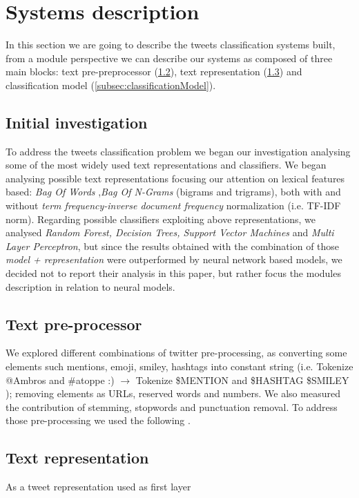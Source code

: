 \section{Systems description} \label{sec:system}

In this section we are going to describe the tweets classification systems built, from a module perspective we can describe our systems as composed of three main blocks: text pre-preprocessor (\cref{subsec:preprocessing}),  text representation (\cref{subsec:representation}) and classification model (\cref{subsec:classificationModel}). 


\subsection{Initial investigation} \label{subsec:boh}
To address the tweets classification problem we began our investigation analysing some of the most widely used text representations and classifiers.
We began analysing possible text representations focusing our attention on lexical features based: \emph{Bag Of Words} \cite{harris1954distributional},\emph{Bag Of N-Grams} (bigrams and trigrams), both with and without \emph{term frequency-inverse document frequency} normalization (i.e. TF-IDF norm).
Regarding possible classifiers exploiting above representations,  we analysed \emph{Random Forest, Decision Trees, Support Vector Machines} and \emph{Multi Layer Perceptron}, but since the results obtained with the combination of those \emph{model + representation} were outperformed by neural network based models, we decided not to report their analysis in this paper, but rather focus the modules description in relation to neural models.


\subsection{Text pre-processor} \label{subsec:preprocessing}


We explored different combinations of twitter pre-processing, as converting some elements such mentions, emoji, smiley, hashtags into constant string (i.e. Tokenize @Ambros and \#atoppe :) $\rightarrow $ Tokenize \$MENTION and \$HASHTAG \$SMILEY ); removing elements as URLs, reserved words and numbers.
We also measured the contribution of stemming, stopwords and punctuation removal.
To address those pre-processing we used the following \cite{nltk} \cite{tweets-preprocessor}.

\subsection{Text representation} \label{subsec:representation}
As a tweet representation used as first layer


